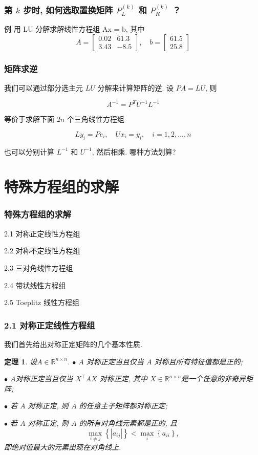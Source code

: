 \documentclass[notheorems,serif]{beamer}
\newcommand{\hei}[1]{{\HEI#1}}
\newtheorem{theorem}{\hei{定理}}
\begin{document}
\begin{frame}
\frametitle{第 $k$ 步时, 如何选取置换矩阵 $P^{(k)}_L$ 和 $P^{(k)}_R$ ？}
{例} 用 LU 分解求解线性方程组 Ax = b, 其中
\begin{equation}
A=\left[\begin{array}{cc}{0.02} & {61.3} \\ {3.43} & {-8.5}\end{array}\right], \quad b=\left[\begin{array}{c}{61.5} \\ {25.8}\end{array}\right]
\end{equation}
\end{frame}

\begin{frame}
\frametitle{矩阵求逆}
我们可以通过部分选主元 $LU$ 分解来计算矩阵的逆. 设 $P A = LU$, 则

$$
A^{-1}=P^{T} U^{-1} L^{-1}
$$

等价于求解下面 $2n$ 个三角线性方程组

$$
L y_{i}=P e_{i}, \quad U x_{i}=y_{i}, \quad i=1,2, \ldots, n
$$

也可以分别计算 $L^{-1}$ 和 $U^{−1}$, 然后相乘. 哪种方法划算?
\end{frame}

\section{特殊方程组的求解}
\begin{frame}
\frametitle{特殊方程组的求解}
2.1 \qquad 对称正定线性方程组

2.2 \qquad 对称不定线性方程组

2.3 \qquad 三对角线性方程组

2.4 \qquad 带状线性方程组

2.5 \qquad Toeplitz 线性方程组

\end{frame}

\begin{frame}
\frametitle{2.1 \qquad 对称正定线性方程组}
我们首先给出对称正定矩阵的几个基本性质.

\begin{theorem}
	设$ A ∈ \mathbb{R}^{n×n}$.
	$\bullet$ $A$ 对称正定当且仅当 $A$ 对称且所有特征值都是正的;
	
	$\bullet$ $A $对称正定当且仅当 $X^{⊺}AX$ 对称正定, 其中 $X ∈ \mathbb{R}^{n×n} $是一个任意的非奇异矩阵;
	
	$\bullet$ 若 $A$ 对称正定, 则 $A$ 的任意主子矩阵都对称正定;
	
	$\bullet$ 若 $A$ 对称正定, 则 $A$ 的所有对角线元素都是正的, 且
	$$
	\max _{i \neq j}\left\{\left|a_{i j}\right|\right\}<\max _{i}\left\{a_{i i}\right\}
	,$$即绝对值最大的元素出现在对角线上.
\end{theorem}
\end{frame}
\end{document}

